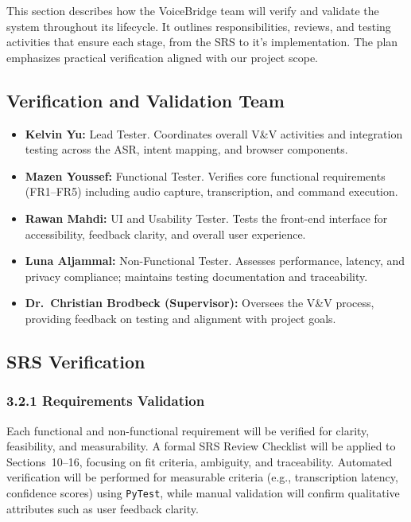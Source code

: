 \documentclass[12pt, titlepage]{article}
\begin{document}
This section describes how the VoiceBridge team will verify and validate the system throughout its lifecycle. It outlines responsibilities, reviews, and testing activities that ensure each stage, from the SRS to it’s implementation. The plan emphasizes practical verification aligned with our project scope.

\subsection{Verification and Validation Team}

\begin{itemize}
    \item \textbf{Kelvin Yu:} Lead Tester. Coordinates overall V\&V activities and integration testing across the ASR, intent mapping, and browser components.
    \item \textbf{Mazen Youssef:} Functional Tester. Verifies core functional requirements (FR1--FR5) including audio capture, transcription, and command execution.
    \item \textbf{Rawan Mahdi:} UI and Usability Tester. Tests the front-end interface for accessibility, feedback clarity, and overall user experience.
    \item \textbf{Luna Aljammal:} Non-Functional Tester. Assesses performance, latency, and privacy compliance; maintains testing documentation and traceability.
    \item \textbf{Dr.~Christian Brodbeck (Supervisor):} Oversees the V\&V process, providing feedback on testing and alignment with project goals.
\end{itemize}


\subsection{SRS Verification}

\subsubsection*{3.2.1 Requirements Validation}
Each functional and non-functional requirement will be verified for clarity, feasibility, and measurability. A formal SRS Review Checklist will be applied to Sections~10--16, focusing on fit criteria, ambiguity, and traceability. Automated verification will be performed for measurable criteria (e.g., transcription latency, confidence scores) using \texttt{PyTest}, while manual validation will confirm qualitative attributes such as user feedback clarity.
\end{document}

